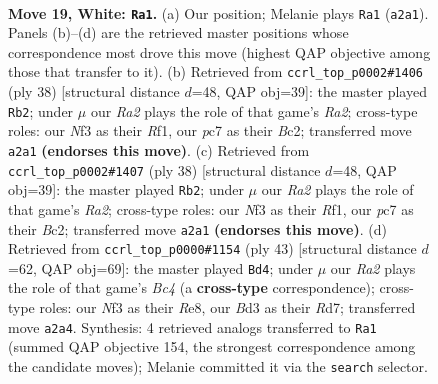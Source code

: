 \documentclass[11pt]{article}
\begin{document}
\clearpage

\begin{figure}[p]\centering
\begin{subfigure}{0.46\textwidth}\centering
\resizebox{\linewidth}{!}{%
\newchessgame
\chessboard[
  setfen={r1b1kb1r/2p5/1pn3p1/p4p1p/3P4/1PPB1NP1/R4P1P/2BR2K1 w q - 8 19},
  showmover=false,
  pgfstyle=straightmove, color=movearrow, markmove={a2-a1}
]}
\caption{}
\end{subfigure}\hfill
\begin{subfigure}{0.46\textwidth}\centering
\resizebox{\linewidth}{!}{%
\newchessgame
\chessboard[
  setfen={r1b1k2r/pp3ppp/2p1p3/1P4B1/1b1P4/4PN2/R1B1nPPP/5R1K w kq - 3 20},
  showmover=false,
  pgfstyle=straightmove, color=movearrow, markmove={a2-b2}
]}
\caption{}
\end{subfigure}
\\[4pt]
\begin{subfigure}{0.46\textwidth}\centering
\resizebox{\linewidth}{!}{%
\newchessgame
\chessboard[
  setfen={r1b1k2r/pp3ppp/2p1p3/1P4B1/1b1P4/4PN2/R1B1nPPP/5R1K w kq - 3 20},
  showmover=false,
  pgfstyle=straightmove, color=movearrow, markmove={a2-b2}
]}
\caption{}
\end{subfigure}\hfill
\begin{subfigure}{0.46\textwidth}\centering
\resizebox{\linewidth}{!}{%
\newchessgame
\chessboard[
  setfen={2k1r3/1ppr4/p1p3p1/2bnppN1/8/PP1P2P1/2PBRP1P/R5K1 b - - 7 22},
  showmover=false,
  pgfstyle=straightmove, color=movearrow, markmove={c5-d4}
]}
\caption{}
\end{subfigure}
\caption{\textbf{Move 19, White: \texttt{Ra1}.} (a) Our position; Melanie plays \texttt{Ra1} (\texttt{a2a1}). Panels (b)--(d) are the retrieved master positions whose correspondence most drove this move (highest QAP objective among those that transfer to it). (b) Retrieved from \texttt{ccrl\_top\_p0002\#1406} (ply 38) [structural distance $d$=48, QAP obj=39]: the master played \texttt{Rb2}; under $\mu$ our \emph{Ra2} plays the role of that game's \emph{Ra2}; cross-type roles: our \emph{N}f3 as their \emph{R}f1, our \emph{p}c7 as their \emph{B}c2; transferred move \texttt{a2a1} \textbf{(endorses this move)}. (c) Retrieved from \texttt{ccrl\_top\_p0002\#1407} (ply 38) [structural distance $d$=48, QAP obj=39]: the master played \texttt{Rb2}; under $\mu$ our \emph{Ra2} plays the role of that game's \emph{Ra2}; cross-type roles: our \emph{N}f3 as their \emph{R}f1, our \emph{p}c7 as their \emph{B}c2; transferred move \texttt{a2a1} \textbf{(endorses this move)}. (d) Retrieved from \texttt{ccrl\_top\_p0000\#1154} (ply 43) [structural distance $d$=62, QAP obj=69]: the master played \texttt{Bd4}; under $\mu$ our \emph{Ra2} plays the role of that game's \emph{Bc4} (a \textbf{cross-type} correspondence); cross-type roles: our \emph{N}f3 as their \emph{R}e8, our \emph{B}d3 as their \emph{R}d7; transferred move \texttt{a2a4}. Synthesis: 4 retrieved analogs transferred to \texttt{Ra1} (summed QAP objective 154, the strongest correspondence among the candidate moves); Melanie committed it via the \texttt{search} selector.}
\label{fig:thought-m36}
\end{figure}
\end{document}
